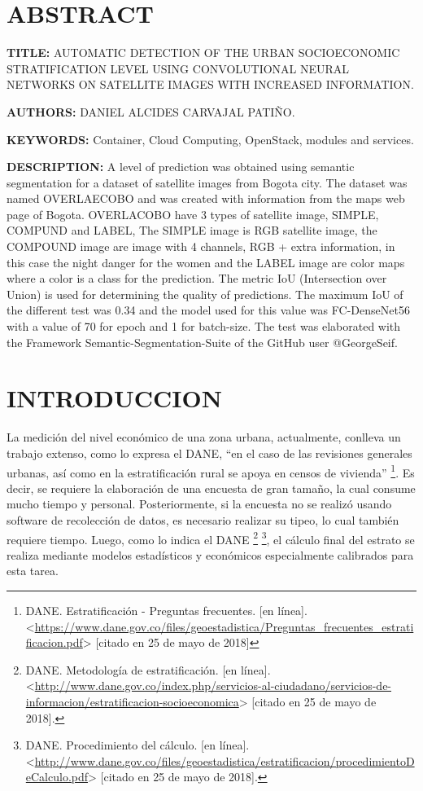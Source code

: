   
	\newpage\chapter*{ABSTRACT}
    \textbf{TITLE:} AUTOMATIC DETECTION OF THE URBAN SOCIOECONOMIC STRATIFICATION LEVEL USING CONVOLUTIONAL NEURAL NETWORKS ON SATELLITE IMAGES WITH INCREASED INFORMATION.
    
    \textbf{AUTHORS:} DANIEL ALCIDES CARVAJAL PATIÑO.
    
    \textbf{KEYWORDS:} Container, Cloud Computing, OpenStack, modules and services.
    
    \textbf{DESCRIPTION:} A level of prediction was obtained using semantic segmentation for a dataset of satellite images from Bogota city.  The dataset was named OVERLAECOBO and was created with information from the maps web page of Bogota. OVERLACOBO have 3 types of satellite image, SIMPLE, COMPUND and LABEL, The SIMPLE image is RGB satellite image,  the COMPOUND image are image with 4 channels, RGB + extra information, in this case the night danger for the women and the LABEL image are color maps where a color is a class for the prediction. The metric IoU (Intersection over Union) is used for determining the quality of predictions. The maximum IoU of the different test was 0.34 and the model used for this value was FC-DenseNet56 with a value of 70 for epoch and 1 for batch-size. The test was elaborated with the Framework Semantic-Segmentation-Suite of the GitHub user @GeorgeSeif. 
    
\newpage\chapter*{INTRODUCCION}

La medición del nivel económico de una zona urbana, actualmente, conlleva un trabajo extenso, como lo expresa el DANE, “en el caso de las revisiones generales urbanas, así como en la estratificación rural se apoya en censos de vivienda” \footnote{DANE. Estratificación - Preguntas frecuentes. [en línea]. <\url{https://www.dane.gov.co/files/geoestadistica/Preguntas_frecuentes_estratificacion.pdf}> [citado en 25 de mayo de 2018]}. Es decir, se requiere la elaboración de una encuesta de gran tamaño, la cual consume mucho tiempo y personal. Posteriormente, si la encuesta no se realizó usando software de recolección de datos, es necesario realizar su tipeo, lo cual también requiere tiempo. Luego, como lo indica el DANE \footnote{DANE. Metodología de estratificación. [en línea]. <\url{http://www.dane.gov.co/index.php/servicios-al-ciudadano/servicios-de-informacion/estratificacion-socioeconomica}> [citado en 25 de mayo de 2018].} \footnote{DANE. Procedimiento del cálculo. [en línea]. <\url{http://www.dane.gov.co/files/geoestadistica/estratificacion/procedimientoDeCalculo.pdf}> [citado en 25 de mayo de 2018].}, el cálculo final del estrato se realiza mediante modelos estadísticos y económicos especialmente calibrados para esta tarea.
    
